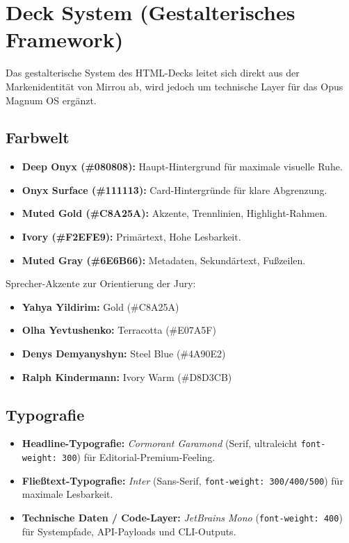 \documentclass[11pt,a4paper]{article}
\begin{document}
\newpage

\section{Deck System (Gestalterisches Framework)}
Das gestalterische System des HTML-Decks leitet sich direkt aus der Markenidentität von Mirrou ab, wird jedoch um technische Layer für das Opus Magnum OS ergänzt.

\subsection{Farbwelt}
\begin{itemize}
    \item \textbf{Deep Onyx (\#080808):} Haupt-Hintergrund für maximale visuelle Ruhe.
    \item \textbf{Onyx Surface (\#111113):} Card-Hintergründe für klare Abgrenzung.
    \item \textbf{Muted Gold (\#C8A25A):} Akzente, Trennlinien, Highlight-Rahmen.
    \item \textbf{Ivory (\#F2EFE9):} Primärtext, Hohe Lesbarkeit.
    \item \textbf{Muted Gray (\#6E6B66):} Metadaten, Sekundärtext, Fußzeilen.
\end{itemize}

Sprecher-Akzente zur Orientierung der Jury:
\begin{itemize}
    \item \textbf{Yahya Yildirim:} Gold (\#C8A25A)
    \item \textbf{Olha Yevtushenko:} Terracotta (\#E07A5F)
    \item \textbf{Denys Demyanyshyn:} Steel Blue (\#4A90E2)
    \item \textbf{Ralph Kindermann:} Ivory Warm (\#D8D3CB)
\end{itemize}

\subsection{Typografie}
\begin{itemize}
    \item \textbf{Headline-Typografie:} \textit{Cormorant Garamond} (Serif, ultraleicht \texttt{font-weight: 300}) für Editorial-Premium-Feeling.
    \item \textbf{Fließtext-Typografie:} \textit{Inter} (Sans-Serif, \texttt{font-weight: 300/400/500}) für maximale Lesbarkeit.
    \item \textbf{Technische Daten / Code-Layer:} \textit{JetBrains Mono} (\texttt{font-weight: 400}) für Systempfade, API-Payloads und CLI-Outputs.
\end{itemize}
\end{document}
